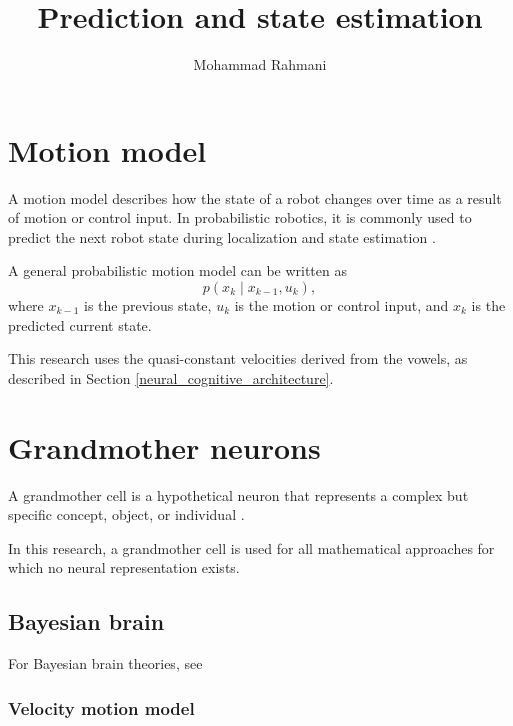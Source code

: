 \documentclass[a4paper]{article}
\title{Prediction and state estimation}
\date{}
\author{Mohammad Rahmani}
\begin{document}
   \maketitle

   \section{Motion model}
      A motion model describes how the state of a robot changes over time as a result of motion or control input. In probabilistic robotics, it is commonly used to predict the next robot state during localization and state estimation \cite{thrun-2005-probabilistic-robotics}.

      A general probabilistic motion model can be written as
      \[
      p(x_k \mid x_{k-1},u_k),
      \]
      where $x_{k-1}$ is the previous state, $u_k$ is the motion or control input, and $x_k$ is the predicted current state.


      This research uses the quasi-constant velocities derived from the vowels, as described in Section \ref{neural_cognitive_architecture}.

   \section{Grandmother neurons}
      A grandmother cell is a hypothetical neuron that represents a complex but specific concept, object, or individual \cite{gross-2002-genealogy-of-the-grandmother-cell, quiroga-2005-invariant-visual-representation-by-single-neurons-in-the-human-brain}.

      In this research, a grandmother cell is used for all mathematical approaches for which no neural representation exists.
      \subsection{Bayesian brain}
         For Bayesian brain theories, see 

         \subsubsection{Velocity motion model}
\end{document}
